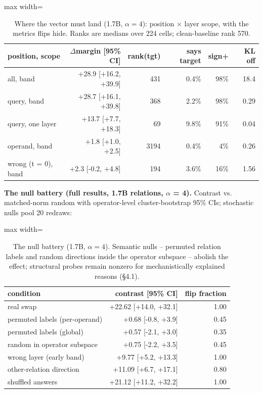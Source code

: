 {
\begin{table}[H]
\centering\small
\setlength{\tabcolsep}{4pt}
\begin{adjustbox}{max width=\textwidth}
\begin{tabular}{lrrrrr}
\toprule
position, scope & \ensuremath{\Delta}margin {[}95\% CI{]} & rank(tgt) & says target &
sign+ & KL off \\
\midrule
all, band & +28.9 {[}+16.2, +39.9{]} & 431 & 0.4\% & 98\% & 18.4 \\
query, band & +28.7 {[}+16.1, +39.8{]} & 368 & 2.2\% & 98\% & 0.29 \\
query, one layer & +13.7 {[}+7.7, +18.3{]} & 69 & 9.8\% & 91\% & 0.04 \\
operand, band & +1.8 {[}+1.0, +2.5{]} & 3194 & 0.4\% & 4\% & 0.26 \\
wrong (t = 0), band & +2.3 {[}-0.2, +4.8{]} & 194 & 3.6\% & 16\% &
1.56 \\
\bottomrule
\end{tabular}
\end{adjustbox}
\caption{Where the vector must land (1.7B, $\alpha=4$): position $\times$ layer scope, with the metrics flips hide. Ranks are medians over 224 cells; clean-baseline rank 570.}
\end{table}
}

\textbf{The null battery (full results, 1.7B relations, \ensuremath{\alpha} = 4).}
Contrast vs. matched-norm random with operator-level cluster-bootstrap
95\% CIs; stochastic nulls pool 20 redraws:

{
\begin{table}[H]
\centering\small
\setlength{\tabcolsep}{4pt}
\begin{adjustbox}{max width=\textwidth}
\begin{tabular}{lrr}
\toprule
condition & contrast {[}95\% CI{]} & flip fraction \\
\midrule
real swap & +22.62 {[}+14.0, +32.1{]} & 1.00 \\
permuted labels (per-operand) & +0.68 {[}-0.8, +3.9{]} & 0.45 \\
permuted labels (global) & +0.57 {[}-2.1, +3.0{]} & 0.35 \\
random in operator subspace & +0.75 {[}-2.2, +3.5{]} & 0.45 \\
wrong layer (early band) & +9.77 {[}+5.2, +13.3{]} & 1.00 \\
other-relation direction & +11.09 {[}+6.7, +17.1{]} & 0.80 \\
shuffled answers & +21.12 {[}+11.2, +32.2{]} & 1.00 \\
\bottomrule
\end{tabular}
\end{adjustbox}
\caption{The null battery (1.7B, $\alpha=4$). Semantic nulls -- permuted relation labels and random directions inside the operator subspace -- abolish the effect; structural probes remain nonzero for mechanistically explained reasons (\S4.1).}
\end{table}
}

